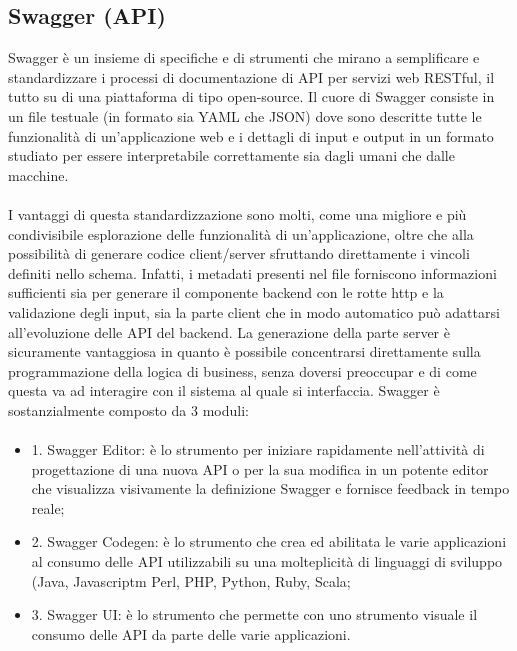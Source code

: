 \subsection{Swagger (API)}
Swagger è un insieme di specifiche e di strumenti che mirano a semplificare e
standardizzare i processi di documentazione di API per servizi web RESTful, il tutto su
di una piattaforma di tipo open-source.
Il cuore di Swagger consiste in un file testuale (in formato sia YAML che JSON) dove
sono descritte tutte le funzionalità di un’applicazione web e i dettagli di input e output
in un formato studiato per essere interpretabile correttamente sia dagli umani che
dalle macchine.
\paragraph{}

I vantaggi di questa standardizzazione sono molti, come una migliore e più condivisibile
esplorazione delle funzionalità di un’applicazione, oltre che alla possibilità di
generare codice client/server sfruttando direttamente i vincoli definiti nello schema. Infatti, i metadati presenti nel file forniscono informazioni sufficienti sia per
generare il componente backend con le rotte http e la validazione degli input, sia la parte client che in modo automatico può adattarsi all’evoluzione delle API del backend. La generazione della parte server è sicuramente vantaggiosa in quanto è possibile concentrarsi direttamente sulla programmazione della logica di business, senza doversi preoccupar e di come questa va ad interagire con il sistema al quale si interfaccia. Swagger è sostanzialmente composto da 3 moduli: 
\paragraph{}
\begin{itemize}
\item 1. Swagger Editor: è lo strumento per iniziare rapidamente nell’attività di
progettazione di una nuova API o per la sua modifica in un potente editor che
visualizza visivamente la definizione Swagger e fornisce feedback in tempo
reale;
\item 2. Swagger Codegen: è lo strumento che crea ed abilitata le varie applicazioni al
consumo delle API utilizzabili su una molteplicità di linguaggi di sviluppo (Java,
Javascriptm Perl, PHP, Python, Ruby, Scala;
\item 3. Swagger UI: è lo strumento che permette con uno strumento visuale il
consumo delle API da parte delle varie applicazioni.
\end{itemize}


